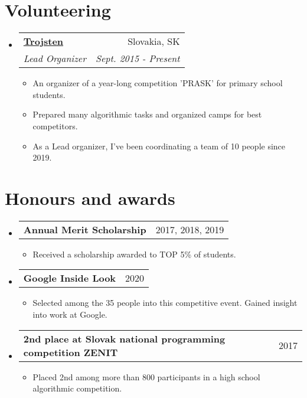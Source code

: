 \documentclass[letterpaper,11pt]{article}
\makeatletter
\newcommand{\resumeItem}[2]{
  \item\small{
    \textbf{#1}{#2 \vspace{-2pt}}
  }
}
\newcommand{\resumeSubheading}[4]{
  \vspace{-1pt}\item
    \begin{tabular*}{0.97\textwidth}{l@{\extracolsep{\fill}}r}
      \textbf{#1} & #2 \\
      \textit{\small#3} & \textit{\small #4} \\
    \end{tabular*}\vspace{-5pt}
}
\newcommand{\resumeSubheadingMY}[4]{
  \vspace{-1pt}\item
    \begin{tabular*}{0.97\textwidth}{l@{\extracolsep{\fill}}r}
      \textbf{#1} & #2 \\
    \end{tabular*}\vspace{-5pt}
}
\newcommand{\resumeSubHeadingListStart}{\begin{itemize}[leftmargin=*]}
\newcommand{\resumeSubHeadingListEnd}{\end{itemize}}
\newcommand{\resumeItemListStart}{\begin{itemize}}
\newcommand{\resumeItemListEnd}{\end{itemize}\vspace{-5pt}}
\makeatother
\begin{document}
\section{Volunteering}
  \resumeSubHeadingListStart
    \resumeSubheading
      {\href{https://www.trojsten.sk/}{Trojsten}}{Slovakia, SK}
      {Lead Organizer}{Sept. 2015 - Present}
      \resumeItemListStart
        \resumeItem{}
          {An organizer of a year-long competition 'PRASK' for primary school students.}
	\resumeItem{}
	  {Prepared many algorithmic tasks and organized camps for best competitors.}
        \resumeItem{}
          {As a Lead organizer, I've been coordinating a team of 10 people since 2019.}
      \resumeItemListEnd
  \resumeSubHeadingListEnd
  
 \section{Honours and awards}
  \resumeSubHeadingListStart
    \resumeSubheadingMY
      {Annual Merit Scholarship}{2017, 2018, 2019}
      {}{}
      \resumeItemListStart
        \resumeItem{}
          {Received a scholarship awarded to TOP 5\% of students.}
      \resumeItemListEnd
    \resumeSubheadingMY
      {Google Inside Look}{2020}
      {}{}
      \resumeItemListStart
        \resumeItem{}
          {Selected among the 35 people into this competitive event. Gained insight
          into work at Google.}
      \resumeItemListEnd
     \resumeSubheadingMY
      {2nd place at Slovak national programming competition ZENIT}{2017}
      {}{}
      \resumeItemListStart
        \resumeItem{}
          {Placed 2nd among more than 800 participants in a high school algorithmic competition.}
      \resumeItemListEnd
      
  \resumeSubHeadingListEnd

\end{document}
